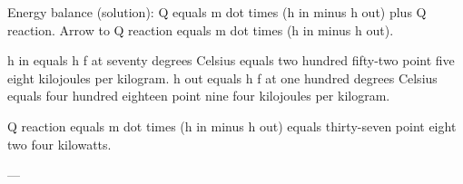 Energy balance (solution):  
Q equals m dot times (h in minus h out) plus Q reaction.  
Arrow to Q reaction equals m dot times (h in minus h out).  

h in equals h f at seventy degrees Celsius equals two hundred fifty-two point five eight kilojoules per kilogram.  
h out equals h f at one hundred degrees Celsius equals four hundred eighteen point nine four kilojoules per kilogram.  

Q reaction equals m dot times (h in minus h out) equals thirty-seven point eight two four kilowatts.  

---